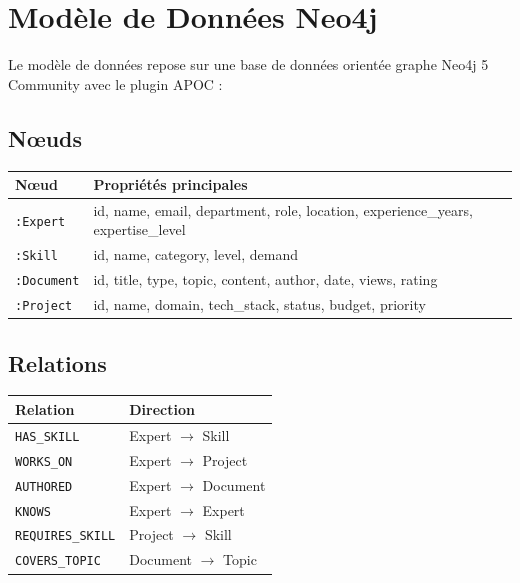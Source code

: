 \documentclass[12pt,a4paper]{article}
\begin{document}
\section{Modèle de Données Neo4j}

Le modèle de données repose sur une base de données orientée graphe Neo4j 5 Community avec le plugin APOC :

\subsection{Nœuds}

\begin{center}
\renewcommand{\arraystretch}{1.3}
\begin{tabular}{|l|l|}
\hline
\rowcolor{bleu!15}
\textbf{Nœud} & \textbf{Propriétés principales} \\
\hline
\texttt{:Expert} & id, name, email, department, role, location, experience\_years, expertise\_level \\
\hline
\texttt{:Skill} & id, name, category, level, demand \\
\hline
\texttt{:Document} & id, title, type, topic, content, author, date, views, rating \\
\hline
\texttt{:Project} & id, name, domain, tech\_stack, status, budget, priority \\
\hline
\end{tabular}
\end{center}

\subsection{Relations}

\begin{center}
\renewcommand{\arraystretch}{1.3}
\begin{tabular}{|l|l|}
\hline
\rowcolor{bleu!15}
\textbf{Relation} & \textbf{Direction} \\
\hline
\texttt{HAS\_SKILL} & Expert $\to$ Skill \\
\hline
\texttt{WORKS\_ON} & Expert $\to$ Project \\
\hline
\texttt{AUTHORED} & Expert $\to$ Document \\
\hline
\texttt{KNOWS} & Expert $\to$ Expert \\
\hline
\texttt{REQUIRES\_SKILL} & Project $\to$ Skill \\
\hline
\texttt{COVERS\_TOPIC} & Document $\to$ Topic \\
\hline
\end{tabular}
\end{center}
\end{document}
